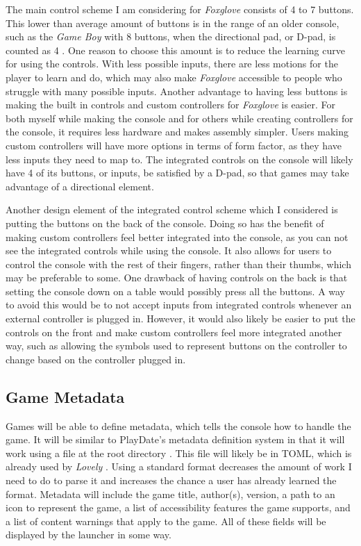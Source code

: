 \documentclass[10pt,twocolumn]{article}
\begin{document}
The main control scheme I am considering for
\textit{Foxglove} consists of 4 to 7
buttons. This lower than average amount of buttons is in the range of an older
console, such as the \textit{Game Boy} with 8 buttons,
when the directional pad, or D-pad,
is counted as 4 \cite{de_winkel_battery-free_2020}.
One reason to choose this amount is to
reduce the learning curve for using the controls. With less possible inputs,
there are less motions for the player to learn and do, which may also make
\textit{Foxglove} accessible to people who struggle with many possible inputs.
Another
advantage to having less buttons is making the built in controls and custom
controllers for \textit{Foxglove} is easier.
For both myself while making the console and
for others while creating controllers for the console, it requires less hardware
and makes assembly simpler. Users making custom controllers will have more
options in terms of form factor, as they have less inputs they need to map to.
The integrated controls on the console will likely have 4 of its buttons, or
inputs, be satisfied by a D-pad, so that games may take advantage of a
directional element.

Another design element of the integrated control scheme which I considered
is putting the buttons on the back of the console. Doing so has the benefit of
making custom controllers feel better integrated into the console, as you can
not see the integrated controls while using the console. It also allows for
users to control the console with the rest of their fingers, rather than
their thumbs, which may be preferable to some. One drawback of having controls
on the back is that setting the console down on a table would possibly press all
the buttons. A way to avoid this would be to not accept inputs from integrated
controls whenever an external controller is plugged in. However, it would also
likely be easier to put the controls on the front and make custom controllers
feel more integrated another way, such as allowing the symbols used to represent
buttons on the controller to change based on the controller plugged in.

\subsection{Game Metadata}

Games will be able to define metadata, which tells the console how to handle the
game. It will be similar to PlayDate's metadata definition system in that it
will work using a file at the root directory \cite{inc_inside_nodate}. This file
will likely be in TOML, which is already used by \textit{Lovely}
\cite{green_ethangreen-devlovely-injector_2025}. Using a standard format
decreases the amount of work I need to do to parse it and increases the chance a
user has already learned the format. Metadata will include the game title,
author(s), version, a path to an icon to represent the game,
a list of accessibility features the game supports, and a list of content
warnings that apply to the game. All of these fields will be displayed by the
launcher in some way.
\end{document}
